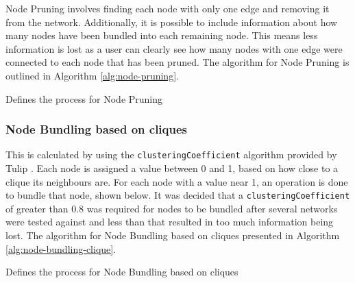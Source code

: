 \documentclass[../dissertation.tex]{subfiles}
\begin{document}
Node Pruning involves finding each node with only one edge and removing it from the network. Additionally, it is possible to include information about how many nodes have been bundled into each remaining node. This means less information is lost as a user can clearly see how many nodes with one edge were connected to each node that has been pruned. The algorithm for Node Pruning is outlined in Algorithm \ref{alg:node-pruning}.

\begin{algorithm}
\caption{Defines the process for Node Pruning}
\label{alg:node-pruning}
\begin{algorithmic}
 
    \ENDIF 
\ENDFOR
{} 
\ENDFOR
\end{algorithmic}
\end{algorithm}

\subsubsection{Node Bundling based on cliques}

This is calculated by using the \texttt{clusteringCoefficient} algorithm provided by Tulip \cite{tulip-clustering-coeff-doc}. Each node is assigned a value between 0 and 1, based on how close to a clique its neighbours are. For each node with a value near 1, an operation is done to bundle that node, shown below. It was decided that a \texttt{clusteringCoefficient} of greater than 0.8 was required for nodes to be bundled after several networks were tested against and less than that resulted in too much information being lost. The algorithm for Node Bundling based on cliques presented in Algorithm \ref{alg:node-bundling-clique}.

\begin{algorithm}
\caption{Defines the process for Node Bundling based on cliques}
\label{alg:node-bundling-clique}
\begin{algorithmic}
 
 
    \ENDIF
\ENDFOR
{}
      
\ENDFOR

\end{algorithmic}
\end{algorithm}
\end{document}
